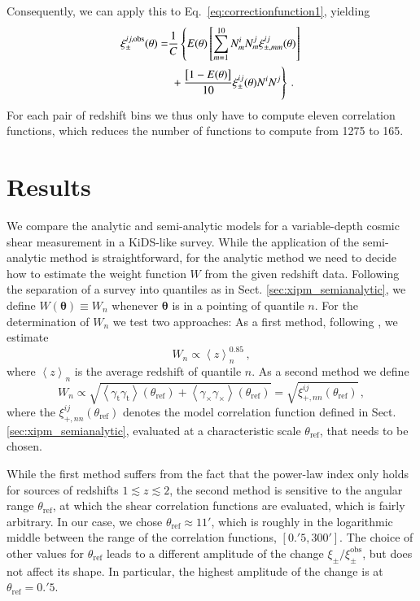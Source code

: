 \documentclass{aa}
\renewcommand{\rm}{\mathrm}
\def\b#1{\bm{#1}}
\def\la{\left<}
\def\ra{\right>}
\begin{document}
Consequently, we can apply this to Eq.~\eqref{eq:correctionfunction1}, yielding
\begin{align}
\xi_{\pm}^{ij,\rm{obs}}(\theta) = & \frac{1}{C}\left\{ E(\theta)\left[\sum_{m=1}^{10} N_m^iN_m^j \xi_{\pm,mm}^{ij}(\theta)\right]\right.\nonumber\\
& \left.\vphantom{\sum_{m=1}^10}+\frac{\big[1-E(\theta)\big]}{10}\xi_\pm^{ij}(\theta)N^iN^j\right\}\, .
\label{eq:correctionfunction2}
\end{align}
For each pair of redshift bins we thus only have to compute eleven correlation functions, which reduces the number of functions to compute from 1275 to 165.


\section{Results}
\label{sec:results}
We compare the analytic and semi-analytic models for a variable-depth cosmic shear measurement in a KiDS-like survey. While the application of the semi-analytic method is straightforward, for the analytic method we need to decide how to estimate the weight function $W$ from the given redshift data. Following the separation of a survey into quantiles as in Sect. \ref{sec:xipm_semianalytic}, we define $W(\b\theta)\equiv W_n$ whenever $\b\theta$ is in a pointing of quantile $n$. For the determination of $W_n$ we test two approaches:
 As a first method, following \citet{2006APh....26...91V,1997A&A...322....1B}, we estimate 
\begin{equation}
W_n \propto \la z \ra _n^{0.85}\, ,
\end{equation}
where $\la z\ra_n$ is the average redshift of quantile $n$. As a second method we define \begin{equation}
W_n \propto \sqrt{ \la\gamma_{\rm{t}}\gamma_{\rm{t}}\ra (\theta_{\rm{ref}}) + \la \gamma_\times\gamma_\times\ra (\theta_{\rm{ref}})} = \sqrt{\xi_{+,nn}^{ij}(\theta_{\rm{ref}})}\, ,
\end{equation}
where the $\xi_{+,nn}^{ij}(\theta_{\rm{ref}})$ denotes the model correlation function defined in Sect. \ref{sec:xipm_semianalytic}, evaluated at a characteristic scale $\theta_{\rm{ref}}$, that needs to be chosen.

While the first method suffers from the fact that the power-law index only holds for sources of redshifts $1\lesssim z \lesssim 2$, the second method is sensitive to the angular range $\theta_{\rm{ref}}$, at which the shear correlation functions are evaluated, which is fairly arbitrary. In our case, we chose $\theta_{\rm{ref}}\approx 11'$, which is roughly in the logarithmic middle between the range of the correlation functions, $[0.\!'5,300']$. The choice of other values for $\theta_{\rm{ref}}$ leads to a different amplitude of the change $\xi_\pm/\xi_\pm^{\rm{obs}}$, but does not affect its shape. In particular, the highest amplitude of the change is at $\theta_{\rm{ref}}=0.\!'5$.
\end{document}
